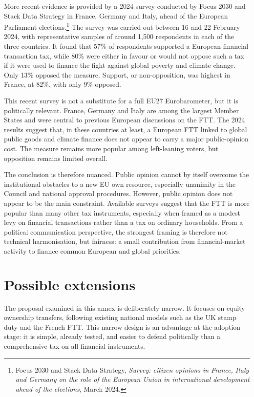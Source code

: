 \documentclass[../../main]{subfiles}
\begin{document}
More recent evidence is provided by a 2024 survey conducted by Focus 2030 and Stack Data Strategy in France, Germany and Italy, ahead of the European Parliament elections.\footnote{Focus 2030 and Stack Data Strategy, \textit{Survey: citizen opinions in France, Italy and Germany on the role of the European Union in international development ahead of the elections}, March 2024.} The survey was carried out between 16 and 22 February 2024, with representative samples of around 1,500 respondents in each of the three countries. It found that 57\% of respondents supported a European financial transaction tax, while 80\% were either in favour or would not oppose such a tax if it were used to finance the fight against global poverty and climate change. Only 13\% opposed the measure. Support, or non-opposition, was highest in France, at 82\%, with only 9\% opposed.

This recent survey is not a substitute for a full EU27 Eurobarometer, but it is politically relevant. France, Germany and Italy are among the largest Member States and were central to previous European discussions on the FTT. The 2024 results suggest that, in these countries at least, a European FTT linked to global public goods and climate finance does not appear to carry a major public-opinion cost. The measure remains more popular among left-leaning voters, but opposition remains limited overall.

The conclusion is therefore nuanced. Public opinion cannot by itself overcome the institutional obstacles to a new EU own resource, especially unanimity in the Council and national approval procedures. However, public opinion does not appear to be the main constraint. Available surveys suggest that the FTT is more popular than many other tax instruments, especially when framed as a modest levy on financial transactions rather than a tax on ordinary households. From a political communication perspective, the strongest framing is therefore not technical harmonisation, but fairness: a small contribution from financial-market activity to finance common European and global priorities.

\section{Possible extensions}

The proposal examined in this annex is deliberately narrow. It focuses on equity ownership transfers, following existing national models such as the UK stamp duty and the French FTT. This narrow design is an advantage at the adoption stage: it is simple, already tested, and easier to defend politically than a comprehensive tax on all financial instruments.
\end{document}
